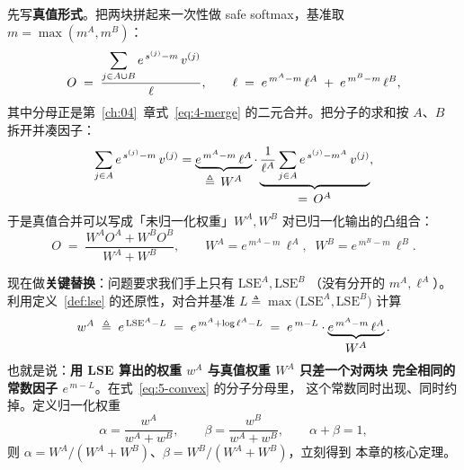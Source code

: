 先写\textbf{真值形式}。把两块拼起来一次性做 safe softmax，基准取
$m = \max(m^{A}, m^{B})$：
\begin{equation}
  O \;=\; \frac{\displaystyle\sum\sb{j \in A \cup B} e^{\,s^{(j)} - m}\, v^{(j)}}
               {\displaystyle\ell}, \qquad
  \ell \;=\; e^{\,m^{A} - m}\,\ell^{A} \;+\; e^{\,m^{B} - m}\,\ell^{B} ,
  \label{eq:5-merge-true}
\end{equation}
其中分母正是第~\ref{ch:04}~章式~\ref{eq:4-merge} 的二元合并。把分子的求和按
$A$、$B$ 拆开并凑因子：
\begin{equation}
  \sum\sb{j \in A} e^{\,s^{(j)} - m}\, v^{(j)}
  = \underbrace{e^{\,m^{A} - m}\,\ell^{A}}\sb{\textstyle \triangleq\, W^{A}}
    \cdot \underbrace{\frac{1}{\ell^{A}} \sum\sb{j \in A} e^{\,s^{(j)} - m^{A}}\, v^{(j)}}\sb{\textstyle =\, O^{A}} ,
  \label{eq:5-split}
\end{equation}
于是真值合并可以写成「未归一化权重」$W^{A}, W^{B}$ 对已归一化输出的凸组合：
\begin{equation}
  O \;=\; \frac{W^{A} O^{A} + W^{B} O^{B}}{W^{A} + W^{B}},
  \qquad W^{A} = e^{\,m^{A} - m}\,\ell^{A}, \;\;
          W^{B} = e^{\,m^{B} - m}\,\ell^{B} .
  \label{eq:5-convex}
\end{equation}

现在做\textbf{关键替换}：问题要求我们手上只有 $\mathrm{LSE}^{A}, \mathrm{LSE}^{B}$
（没有分开的 $m^{A}, \ell^{A}$）。利用定义~\ref{def:lse} 的还原性，对合并基准
$L \triangleq \max\bigl(\mathrm{LSE}^{A}, \mathrm{LSE}^{B}\bigr)$ 计算
\begin{equation}
  w^{A} \;\triangleq\; e^{\,\mathrm{LSE}^{A} - L}
         \;=\; e^{\,m^{A} + \log \ell^{A} - L}
         \;=\; e^{\,m - L} \cdot \underbrace{e^{\,m^{A} - m}\,\ell^{A}}\sb{\textstyle W^{A}} .
  \label{eq:5-key}
\end{equation}
也就是说：\textbf{用 LSE 算出的权重 $w^{A}$ 与真值权重 $W^{A}$ 只差一个对两块
完全相同的常数因子 $e^{\,m - L}$}。在式~\ref{eq:5-convex} 的分子分母里，
这个常数同时出现、同时约掉。定义归一化权重
\begin{equation}
  \alpha = \frac{w^{A}}{w^{A} + w^{B}}, \qquad
  \beta  = \frac{w^{B}}{w^{A} + w^{B}}, \qquad \alpha + \beta = 1 ,
  \label{eq:5-alpha-beta}
\end{equation}
则 $\alpha = W^{A}/(W^{A}+W^{B})$、$\beta = W^{B}/(W^{A}+W^{B})$，立刻得到
本章的核心定理。

